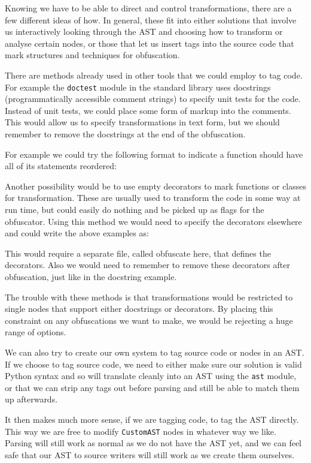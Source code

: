 \documentclass[twoside,a4paper]{report}
\begin{document}
Knowing we have to be able to direct and control transformations, there are a few different ideas of how. In general, these fit into
either solutions that involve us interactively looking through the AST and choosing how to transform or analyse certain
nodes, or those that let us insert tags into the source code that mark structures and techniques for obfuscation.

There are methods already used in other tools that we could employ to tag code. For example the \texttt{doctest} module in the standard
library uses docstrings (programmatically accessible comment strings) to specify unit tests for the code. Instead of unit tests,
we could place some form of markup into the comments. This would allow us to specify transformations in text form, but we should
remember to remove the docstrings at the end of the obfuscation.

For example we could try the following format to indicate a function should have all of its statements reordered:



Another possibility would be to use empty decorators to mark functions or classes for transformation. These are usually used to
transform the code in some way at run time, but could easily do nothing and be picked up as flags for the obfuscator. Using this
method we would need to specify the decorators elsewhere and could write the above examples as:



This would require a separate file, called obfuscate here, that defines the decorators. Also we would need to remember to
remove these decorators after obfuscation, just like in the docstring example.

The trouble with these methods is that transformations would be restricted to single nodes that support either docstrings or
decorators. By placing this constraint on any obfuscations we want to make, we would be rejecting a huge range of options.

We can also try to create our own system to tag source code or nodes in an AST. If we choose to tag source code, we need
to either make sure our solution is valid Python syntax and so will translate cleanly into an AST using the \texttt{ast}
module, or that we can strip any tags out before parsing and still be able to match them up afterwards.

It then makes much more sense, if we are tagging code, to tag the AST directly. This way we are free to modify \texttt{CustomAST}
nodes in whatever way we like. Parsing will still work as normal as we do not have the AST yet, and we can feel safe that our AST
to source writers will still work as we create them ourselves.
\end{document}
